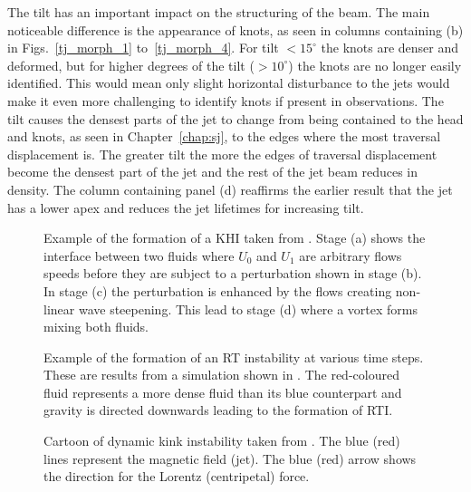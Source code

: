 \documentclass[12pt]{ociamthesis}
\newcommand{\mfig}[4]{
  \begin{figure}
  \begin{center}
  \texttt{[image: \#2]}
  \caption{#3}
  \label{#4}
  \end{center}
  \end{figure}}
\newcommand{\degs}{^{\circ}}
\begin{document}
%
The tilt has an important impact on the structuring of the beam. The main noticeable difference is the appearance of knots, as seen in columns containing (b) in Figs.~\ref{tj_morph_1} to~\ref{tj_morph_4}. For tilt $<15\degs$ the knots are denser and deformed, but for higher degrees of the tilt ($> 10^{\circ}$) the knots are no longer easily identified. This would mean only slight horizontal disturbance to the jets would make it even more challenging to identify knots if present in observations. The tilt causes the densest parts of the jet to change from being contained to the head and knots, as seen in Chapter~\ref{chap:sj}, to the edges where the most traversal displacement is. The greater tilt the more the edges of traversal displacement become the densest part of the jet and the rest of the jet beam reduces in density. The column containing panel (d) reaffirms the earlier result that the jet has a lower apex and reduces the jet lifetimes for increasing tilt.
%
\begin{figure}
\captionsetup[subfigure]{labelformat=empty}
\centering
{}
\caption{Example of the formation of a KHI taken from \cite{Barbulescu2018SoPh29386B}. Stage (a) shows the interface between two fluids where $U_0$ and $U_1$ are arbitrary flows speeds before they are subject to a perturbation shown in stage (b). In stage (c) the perturbation is enhanced by the flows creating non-linear wave steepening. This lead to stage (d) where a vortex forms mixing both fluids.}
\label{KHI_example}
\end{figure}
\begin{figure}
\captionsetup[subfigure]{labelformat=empty}
\centering
{}
\caption{Example of the formation of an RT instability at various time steps. These are results from a simulation shown in \cite{Liang2019PhFl31k2104L}. The red-coloured fluid represents a more dense fluid than its blue counterpart and gravity is directed downwards leading to the formation of RTI.}
\label{RT_example}
\end{figure}
\begin{figure}
\captionsetup[subfigure]{labelformat=empty}
\centering
{}
\caption{Cartoon of dynamic kink instability taken from \cite{Zaqarashvili2020ApJ893L46Z}. The blue (red) lines represent the magnetic field (jet). The blue (red) arrow shows the direction for the Lorentz (centripetal) force.}
\label{DKI_example}
\end{figure}
\end{document}
